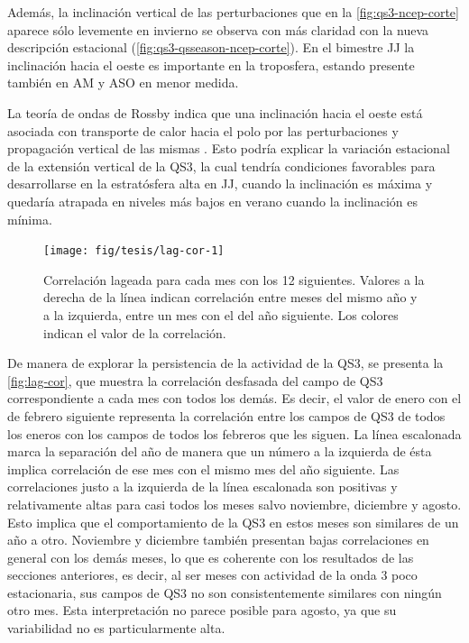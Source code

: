 \documentclass[spanish,a4paper,12pt,oneside]{book}
\begin{document}
Además, la inclinación vertical de las perturbaciones que en la
\autoref{fig:qs3-ncep-corte} aparece sólo levemente en invierno se
observa con más claridad con la nueva descripción estacional
(\autoref{fig:qs3-qsseason-ncep-corte}). En el bimestre JJ la
inclinación hacia el oeste es importante en la troposfera, estando
presente también en AM y ASO en menor medida.

La teoría de ondas de Rossby indica que una inclinación hacia el oeste
está asociada con transporte de calor hacia el polo por las
perturbaciones y propagación vertical de las mismas \citep{James}. Esto
podría explicar la variación estacional de la extensión vertical de la
QS3, la cual tendría condiciones favorables para desarrollarse en la
estratósfera alta en JJ, cuando la inclinación es máxima y quedaría
atrapada en niveles más bajos en verano cuando la inclinación es mínima.

\begin{figure}
\texttt{[image: fig/tesis/lag-cor-1]} \caption{Correlación lageada para cada mes con los 12 siguientes. Valores a la derecha de la línea indican correlación entre meses del mismo año y a la izquierda, entre un mes con el del año siguiente. Los colores indican el valor de la correlación. }\label{fig:lag-cor}
\end{figure}

De manera de explorar la persistencia de la actividad de la QS3, se
presenta la \autoref{fig:lag-cor}, que muestra la correlación desfasada
del campo de QS3 correspondiente a cada mes con todos los demás. Es
decir, el valor de enero con el de febrero siguiente representa la
correlación entre los campos de QS3 de todos los eneros con los campos
de todos los febreros que les siguen. La línea escalonada marca la
separación del año de manera que un número a la izquierda de ésta
implica correlación de ese mes con el mismo mes del año siguiente. Las
correlaciones justo a la izquierda de la línea escalonada son positivas
y relativamente altas para casi todos los meses salvo noviembre,
diciembre y agosto. Esto implica que el comportamiento de la QS3 en
estos meses son similares de un año a otro. Noviembre y diciembre
también presentan bajas correlaciones en general con los demás meses, lo
que es coherente con los resultados de las secciones anteriores, es
decir, al ser meses con actividad de la onda 3 poco estacionaria, sus
campos de QS3 no son consistentemente similares con ningún otro mes.
Esta interpretación no parece posible para agosto, ya que su
variabilidad no es particularmente alta.
\end{document}
